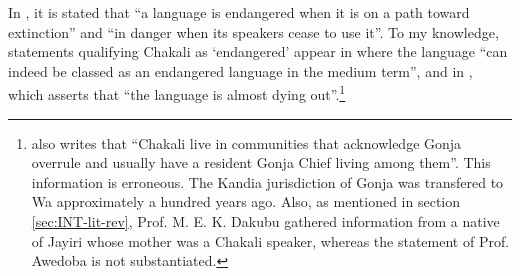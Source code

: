 In \citet[2]{Reco03}, it is  stated that  ``a language is endangered when it is
on
a path toward extinction''  and  ``in danger when its speakers cease to use
it''.  To my knowledge, statements qualifying Chakali as `endangered'  appear
in \cite{Daku05} where  the language ``can indeed be classed as an endangered
language in the medium term'',  and in \cite{Awed06},  which asserts that  ``the
language is almost dying out''.\footnote{\cite{Awed06} also writes that
``Chakali live in communities that acknowledge Gonja overrule and usually have a
resident Gonja Chief living among them''. This information is erroneous.
The Kandia  jurisdiction of Gonja was transfered to Wa approximately  a hundred
years ago. Also, as mentioned in section \ref{sec:INT-lit-rev}, Prof. M. E. K.
Dakubu gathered information from a native of Jayiri whose mother was a Chakali
speaker, whereas the statement of Prof. Awedoba is not substantiated.}


